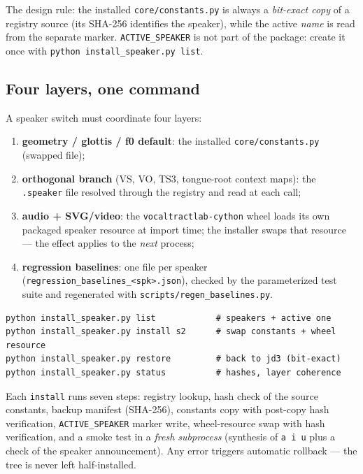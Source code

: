 \documentclass[11pt,a4paper]{article}
\newcommand{\speakerfile}[1]{\texttt{#1.speaker}}
\newcommand{\code}[1]{\texttt{#1}}
\begin{document}
The design rule: the installed \code{core/constants.py} is always a
\emph{bit-exact copy} of a registry source (its SHA-256 identifies
the speaker), while the active \emph{name} is read from the separate
marker. \code{ACTIVE\_SPEAKER} is not part of the package: create it
once with \code{python install\_speaker.py list}.

\subsection{Four layers, one command}

A speaker switch must coordinate four layers:

\begin{enumerate}[leftmargin=1.8em]
\item \textbf{geometry / glottis / f0 default}: the installed
      \code{core/constants.py} (swapped file);
\item \textbf{orthogonal branch} (VS, VO, TS3, tongue-root context
      maps): the \speakerfile{} file resolved through the registry and
      read at each call;
\item \textbf{audio + SVG/video}: the \code{vocaltractlab-cython}
      wheel loads its own packaged speaker resource at import time;
      the installer swaps that resource --- the effect applies to the
      \emph{next} process;
\item \textbf{regression baselines}: one file per speaker
      (\code{regression\_baselines\_<spk>.json}), checked
      by the parameterized test suite and regenerated with
      \code{scripts/regen\_baselines.py}.
\end{enumerate}

\begin{lstlisting}[style=shell]
python install_speaker.py list            # speakers + active one
python install_speaker.py install s2      # swap constants + wheel resource
python install_speaker.py restore         # back to jd3 (bit-exact)
python install_speaker.py status          # hashes, layer coherence
\end{lstlisting}

Each \code{install} runs seven steps: registry lookup, hash check of
the source constants, backup manifest (SHA-256), constants copy with
post-copy hash verification, \code{ACTIVE\_SPEAKER} marker write,
wheel-resource swap with hash verification, and a smoke test in a
\emph{fresh subprocess} (synthesis of \code{a i u} plus a check of
the speaker announcement). Any error triggers automatic rollback ---
the tree is never left half-installed.
\end{document}
